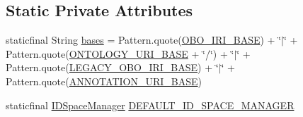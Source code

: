 \subsection*{Static Private Attributes}
\begin{DoxyCompactItemize}
\item 
staticfinal String \hyperlink{enumorg_1_1coode_1_1owlapi_1_1obo_1_1parser_1_1_o_b_o_vocabulary_ac2d49a08cf8835e23dd5dc77c1567dad}{bases} = Pattern.\-quote(\hyperlink{enumorg_1_1coode_1_1owlapi_1_1obo_1_1parser_1_1_o_b_o_vocabulary_a100cf24365c118368a03588b58fe2c7d}{O\-B\-O\-\_\-\-I\-R\-I\-\_\-\-B\-A\-S\-E}) + \char`\"{}$|$\char`\"{} + Pattern.\-quote(\hyperlink{enumorg_1_1coode_1_1owlapi_1_1obo_1_1parser_1_1_o_b_o_vocabulary_aba55026a762172d8705d240c066d429f}{O\-N\-T\-O\-L\-O\-G\-Y\-\_\-\-U\-R\-I\-\_\-\-B\-A\-S\-E} + \char`\"{}/\char`\"{}) + \char`\"{}$|$\char`\"{} + Pattern.\-quote(\hyperlink{enumorg_1_1coode_1_1owlapi_1_1obo_1_1parser_1_1_o_b_o_vocabulary_afb4c3633766d7eb79ce6ff7334e64558}{L\-E\-G\-A\-C\-Y\-\_\-\-O\-B\-O\-\_\-\-I\-R\-I\-\_\-\-B\-A\-S\-E}) + \char`\"{}$|$\char`\"{} + Pattern.\-quote(\hyperlink{enumorg_1_1coode_1_1owlapi_1_1obo_1_1parser_1_1_o_b_o_vocabulary_a4566a0b5e099a30e286d9cc4d282e1e8}{A\-N\-N\-O\-T\-A\-T\-I\-O\-N\-\_\-\-U\-R\-I\-\_\-\-B\-A\-S\-E})
\item 
staticfinal \hyperlink{classorg_1_1coode_1_1owlapi_1_1obo_1_1parser_1_1_i_d_space_manager}{I\-D\-Space\-Manager} \hyperlink{enumorg_1_1coode_1_1owlapi_1_1obo_1_1parser_1_1_o_b_o_vocabulary_a37f44bb8708234ef14d0f05960f0dc0f}{D\-E\-F\-A\-U\-L\-T\-\_\-\-I\-D\-\_\-\-S\-P\-A\-C\-E\-\_\-\-M\-A\-N\-A\-G\-E\-R}
\item 

\end{DoxyCompactItemize}
